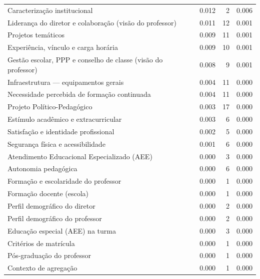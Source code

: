 \begin{tabular}{lrrr}
Caracterização institucional & 0.012 & 2 & 0.006 \\
Liderança do diretor e colaboração (visão do professor) & 0.011 & 12 & 0.001 \\
Projetos temáticos & 0.009 & 11 & 0.001 \\
Experiência, vínculo e carga horária & 0.009 & 10 & 0.001 \\
Gestão escolar, PPP e conselho de classe (visão do professor) & 0.008 & 9 & 0.001 \\
Infraestrutura — equipamentos gerais & 0.004 & 11 & 0.000 \\
Necessidade percebida de formação continuada & 0.004 & 11 & 0.000 \\
Projeto Político-Pedagógico & 0.003 & 17 & 0.000 \\
Estímulo acadêmico e extracurricular & 0.003 & 6 & 0.000 \\
Satisfação e identidade profissional & 0.002 & 5 & 0.000 \\
Segurança física e acessibilidade & 0.001 & 6 & 0.000 \\
Atendimento Educacional Especializado (AEE) & 0.000 & 3 & 0.000 \\
Autonomia pedagógica & 0.000 & 6 & 0.000 \\
Formação e escolaridade do professor & 0.000 & 1 & 0.000 \\
Formação docente (escola) & 0.000 & 1 & 0.000 \\
Perfil demográfico do diretor & 0.000 & 2 & 0.000 \\
Perfil demográfico do professor & 0.000 & 2 & 0.000 \\
Educação especial (AEE) na turma & 0.000 & 3 & 0.000 \\
Critérios de matrícula & 0.000 & 1 & 0.000 \\
Pós-graduação do professor & 0.000 & 1 & 0.000 \\
Contexto de agregação & 0.000 & 1 & 0.000 \\
\bottomrule
\end{tabular}
